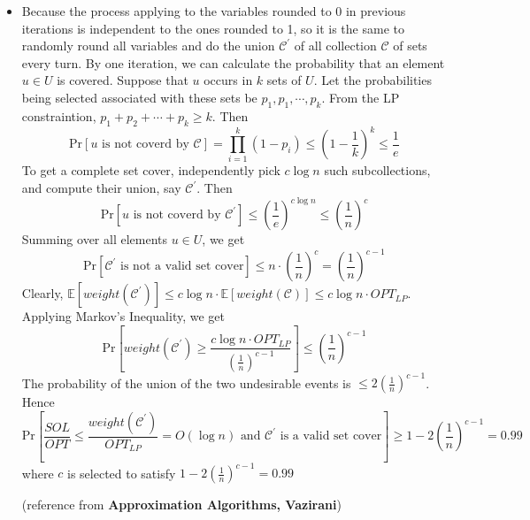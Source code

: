 \documentclass[12pt]{article}
\newenvironment{solution}[2][Solution]{\begin{trivlist}
\item[\hskip \labelsep {\bfseries #1}\hskip \labelsep {\bfseries #2.}]}{\end{trivlist}}
\begin{document}
\begin{solution}{4}
\begin{itemize}
\begin{equation*}
\begin{array}{rrclcl}
                                                    \\
                \end{array}
            \end{equation*}
            \item Because the process applying to the variables rounded to 0 in previous iterations is independent to the ones rounded to 1, so it is the same
            to randomly round all variables and do the union $\mathcal{C}^\prime$ of all collection $\mathcal{C}$ of sets every turn. By one iteration, we can calculate the probability that an element
            $u \in U$ is covered. Suppose that $u$ occurs in $k$ sets of $U$. Let the probabilities being selected associated with these sets be $p_1, p_1, \cdots, p_k$. From 
            the LP constraintion, $p_1 + p_2 + \cdots + p_k \ge k$. Then
            \[\mathrm{Pr}[u \text{ is not coverd by } \mathcal{C}] = \prod_{i=1}^k (1-p_i) \le (1-\frac1k)^k \le \frac{1}{e}\]
            To get a complete set cover, independently pick $c\log n$ such subcollections, and compute their union, say $\mathcal{C}^\prime$. Then
            \[\mathrm{Pr}[u \text{ is not coverd by } \mathcal{C}^\prime] \le (\frac{1}{e})^{c\log n}\le(\frac{1}{n})^c\]
            Summing over all elements $u \in U$, we get
            \[\mathrm{Pr}[\mathcal{C}^\prime \text{ is not a valid set cover}] \le n \cdot (\frac{1}{n})^c = (\frac{1}{n})^{c-1}\]
            Clearly, $\mathbb{E}[weight(\mathcal{C}^\prime)] \le c \log n \cdot \mathbb{E}[weight(\mathcal{C})] \le c \log n \cdot OPT_{LP}$.  
            Applying Markov’s Inequality, we get
            \[\mathrm{Pr}[weight(\mathcal{C}^\prime) \ge \frac{c \log n \cdot OPT_{LP}}{(\frac{1}{n})^{c-1}}] \le (\frac{1}{n})^{c-1}\]
            The probability of the union of the two undesirable events is $\le 2(\frac{1}{n})^{c-1}$. Hence
            \[\mathrm{Pr}[\frac{SOL}{OPT}\le \frac{weight(\mathcal{C}^\prime)}{OPT_{LP}}=O(\log n) \text{ and } \mathcal{C}^\prime \text{ is a valid set cover}] \ge 1 - 2(\frac{1}{n})^{c-1} = 0.99\]
            where $c$ is selected to satisfy $1 - 2(\frac{1}{n})^{c-1} = 0.99$

            (reference from \textbf{Approximation Algorithms, Vazirani})
    \end{itemize}
\end{solution}
\end{document}
